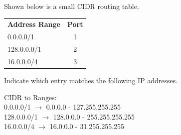 \documentclass[12pt,addpoints,answers]{exam}
\begin{document}
\begin{questions}
\question Shown below is a small CIDR routing table.
\begin{center}
\begin{tabular}{lc}
\toprule
\textbf{Address Range} & \textbf{Port} \\
0.0.0.0/1   & 1 \\
128.0.0.0/1 & 2 \\
16.0.0.0/4  & 3 \\
\bottomrule
\end{tabular}
\end{center}
Indicate which entry matches the following IP addresses.
\begin{center}
	CIDR to Ranges: \\
	0.0.0.0/1   $\rightarrow$ 0.0.0.0 - 127.255.255.255 \\
	128.0.0.0/1 $\rightarrow$ 128.0.0.0 - 255.255.255.255 \\
	16.0.0.0/4  $\rightarrow$ 16.0.0.0 - 31.255.255.255 \\
\end{center}


\end{questions}
\end{document}
